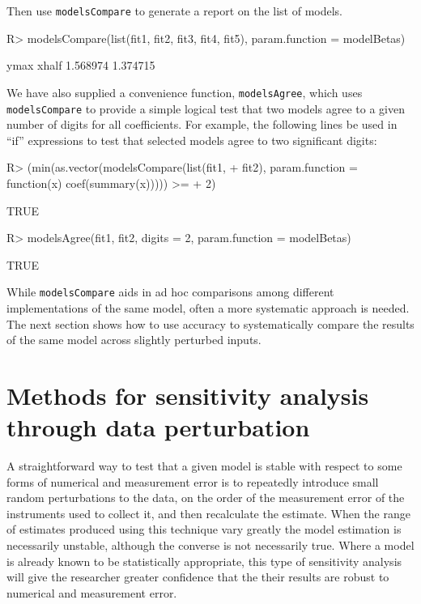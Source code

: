 \documentclass[11pt]{article}
\let\code=\texttt
\newcommand{\pkg}[1]{{\normalfont\fontseries{b}\selectfont #1}}
\begin{document}
Then use \code{modelsCompare} to generate a report on the list of models.

\begin{Schunk}
\begin{Sinput}
R> modelsCompare(list(fit1, fit2, fit3, fit4, fit5), param.function = modelBetas)
\end{Sinput}
\begin{Soutput}
    ymax    xhalf 
1.568974 1.374715 
\end{Soutput}
\end{Schunk}


We have also supplied a convenience function, \code{modelsAgree}, which uses \code{modelsCompare} to provide a simple logical test that two models agree
to a given number of digits for all coefficients. For example, the following lines
 be used in ``if'' expressions to test that selected models agree to two 
 significant digits:                                 

\begin{Schunk}
\begin{Sinput}
R> (min(as.vector(modelsCompare(list(fit1, 
+     fit2), param.function = function(x) coef(summary(x))))) >= 
+     2)
\end{Sinput}
\begin{Soutput}
[1] TRUE
\end{Soutput}
\begin{Sinput}
R> modelsAgree(fit1, fit2, digits = 2, param.function = modelBetas)
\end{Sinput}
\begin{Soutput}
[1] TRUE
\end{Soutput}
\end{Schunk}

While \code{modelsCompare} aids in ad hoc comparisons among different implementations of the same model, often a more systematic approach is needed. The next section shows how to use \pkg{accuracy} to systematically compare the results of the same model across slightly perturbed inputs. 

\section{Methods for sensitivity analysis through data perturbation}

A straightforward way to test that a given model is stable with respect to
some forms of numerical and measurement error is 
to repeatedly introduce small random perturbations to the data, on the order of the measurement error of the instruments used to collect it, and then recalculate the estimate. When the range of estimates produced using 
this technique vary greatly the model estimation is necessarily unstable, although
the converse is not necessarily true. Where a model is already known to be statistically appropriate,
this type of sensitivity analysis will give the researcher greater confidence that the their 
results are robust to numerical and measurement error.
\end{document}
